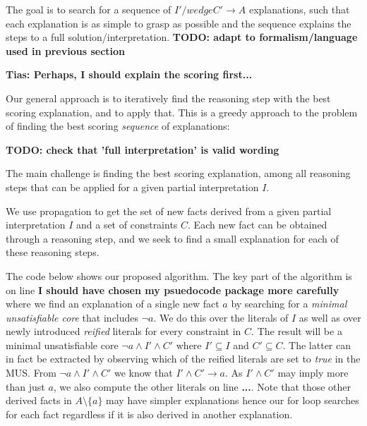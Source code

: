 The goal is to search for a sequence of $I' /wedge C' \rightarrow A$ explanations, such that each explanation is as simple to grasp as possible and the sequence explains the steps to a full solution/interpretation. \textbf{TODO: adapt to formalism/language used in previous section}

\textbf{Tias: Perhaps, I should explain the scoring first...}

Our general approach is to iteratively find the reasoning step with the best scoring explanation, and to apply that. This is a greedy approach to the problem of finding the best scoring \textit{sequence} of explanations:

\textbf{TODO: check that 'full interpretation' is valid wording}
\begin{algorithmic}
\EndWhile
\end{algorithmic}

The main challenge is finding the best scoring explanation, among all reasoning steps that can be applied for a given partial interpretation $I$.

We use propagation to get the set of new facts derived from a given partial interpretation $I$ and a set of constraints $C$. Each new fact can be obtained through a reasoning step, and we seek to find a small explanation for each of these reasoning steps.

The code below shows our proposed algorithm. The key part of the algorithm is on line \textbf{I should have chosen my psuedocode package more carefully} where we find an explanation of a single new fact $a$ by searching for a \textit{minimal unsatisfiable core} that includes $\neg a$. We do this over the literals of $I$ as well as over newly introduced \textit{reified} literals for every constraint in $C$. The result will be a minimal unsatisfiable core $\neg a \wedge I' \wedge C'$ where $I' \subseteq I$ and $C' \subseteq C$. The latter can in fact be extracted by observing which of the reified literals are set to \textit{true} in the MUS. From $\neg a \wedge I' \wedge C'$ we know that $I' \wedge C' \rightarrow a$. As $I' \wedge C'$ may imply more than just $a$, we also compute the other literals on line \textbf{...}. Note that those other derived facts in $A \setminus \{a\}$ may have simpler explanations hence our for loop searches for each fact regardless if it is also derived in another explanation.



